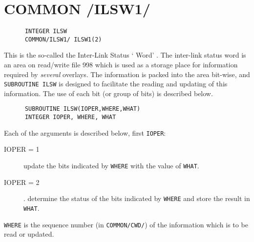\section{\sf COMMON /ILSW1/}
{\small
\begin{verbatim}
      INTEGER ILSW
      COMMON/ILSW1/ ILSW1(2)
\end{verbatim}
}
This is the so-called the Inter-Link Status ` Word' .
The inter-link status word is an area on read/write file 998 which is
used as a storage place for information required by {\em several} overlays.
The information is packed into the area bit-wise, and  {\tt SUBROUTINE
ILSW} is designed to facilitate the reading and updating of this
information.  The use of each bit (or group of bits) is described below.
\begin{verbatim}
      SUBROUTINE ILSW(IOPER,WHERE,WHAT) 
      INTEGER IOPER, WHERE, WHAT
\end{verbatim}
Each of the arguments is described below, first {\tt IOPER}:
\begin{description}
\item[IOPER = 1] update the bits indicated by {\tt WHERE} with the
value of {\tt WHAT}.
\item[IOPER = 2]. determine the status of the bits indicated by
{\tt WHERE} and store the result in {\tt WHAT}.
\end{description}

{\tt WHERE}     is the sequence number (in {\tt COMMON/CWD/}) of the
information which is to be read or updated.

